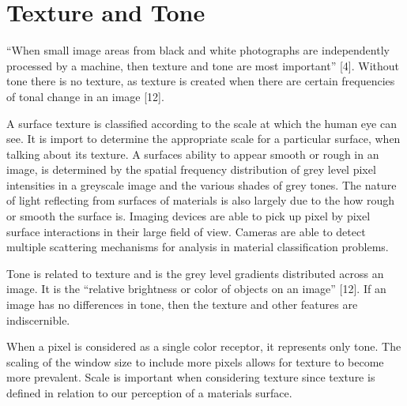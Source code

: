 \section{Texture and Tone}

“When small image areas from black and white photographs are independently processed by a machine, then texture and tone are most important” [4].  Without tone there is no texture, as texture is created when there are certain frequencies of tonal change in an image [12].

A surface texture is classified according to the scale at which the human eye can see.  It is import to determine the appropriate scale for a particular surface, when talking about its texture.  A surfaces ability to appear smooth or rough in an image, is determined by the spatial frequency distribution of grey level pixel intensities in a greyscale image and the various shades of grey tones.  The nature of light reflecting from surfaces of materials is also largely due to the how rough or smooth the surface is.  Imaging devices are able to pick up pixel by pixel surface interactions in their large field of view.  Cameras are able to detect multiple scattering mechanisms for analysis in material classification problems.

Tone is related to texture and is the grey level gradients distributed across an image.  It is the “relative brightness or color of objects on an image” [12].  If an image has no differences in tone, then the texture and other features are indiscernible.

When a pixel is considered as a single color receptor, it represents only tone.  The scaling of the window size to include more pixels allows for texture to become more prevalent.   Scale is important when considering texture since texture is defined in relation to our perception of a materials surface.



